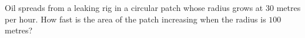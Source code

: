 Oil spreads from a leaking rig in a circular patch whose radius grows at $30$ metres per hour. How fast is the area of the patch increasing when the radius is $100$ metres?
